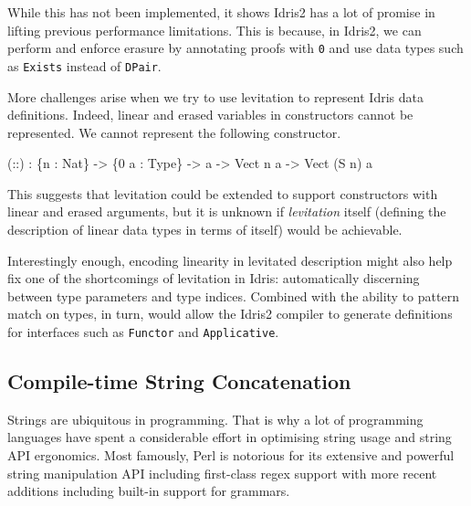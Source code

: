 \documentclass[
]{article}
\newenvironment{Shaded}{}{}
\newcommand{\DataTypeTok}[1]{\textcolor[rgb]{0.56,0.13,0.00}{#1}}
\newcommand{\DecValTok}[1]{\textcolor[rgb]{0.25,0.63,0.44}{#1}}
\newcommand{\NormalTok}[1]{#1}
\newcommand{\OperatorTok}[1]{\textcolor[rgb]{0.40,0.40,0.40}{#1}}
\newcommand{\OtherTok}[1]{\textcolor[rgb]{0.00,0.44,0.13}{#1}}
\begin{document}
While this has not been implemented, it shows Idris2 has a lot of
promise in lifting previous performance limitations. This is because, in
Idris2, we can perform and enforce erasure by annotating proofs with
\texttt{0} and use data types such as \texttt{Exists} instead of
\texttt{DPair}.

More challenges arise when we try to use levitation to represent Idris
data definitions. Indeed, linear and erased variables in constructors
cannot be represented. We cannot represent the following constructor.

\begin{Shaded}
\begin{Highlighting}[]
\NormalTok{(}\OtherTok{::}\NormalTok{) }\OperatorTok{:}\NormalTok{ \{n }\OperatorTok{:} \DataTypeTok{Nat}\NormalTok{\} }\OtherTok{{-}\textgreater{}}\NormalTok{ \{}\DecValTok{0}\NormalTok{ a }\OperatorTok{:} \DataTypeTok{Type}\NormalTok{\} }\OtherTok{{-}\textgreater{}}\NormalTok{ a }\OtherTok{{-}\textgreater{}} \DataTypeTok{Vect}\NormalTok{ n a }\OtherTok{{-}\textgreater{}} \DataTypeTok{Vect}\NormalTok{ (}\DataTypeTok{S}\NormalTok{ n) a }
\end{Highlighting}
\end{Shaded}

This suggests that levitation could be extended to support constructors
with linear and erased arguments, but it is unknown if \emph{levitation}
itself (defining the description of linear data types in terms of
itself) would be achievable.

Interestingly enough, encoding linearity in levitated description might
also help fix one of the shortcomings of levitation in Idris:
automatically discerning between type parameters and type indices.
Combined with the ability to pattern match on types, in turn, would
allow the Idris2 compiler to generate definitions for interfaces such as
\texttt{Functor} and \texttt{Applicative}.

\hypertarget{compile-time-string-concatenation}{%
\subsection{Compile-time String
Concatenation}\label{compile-time-string-concatenation}}

Strings are ubiquitous in programming. That is why a lot of programming
languages have spent a considerable effort in optimising string usage
and string API ergonomics. Most famously, Perl is notorious for its
extensive and powerful string manipulation API including first-class
regex support with more recent additions including built-in support for
grammars.
\end{document}
